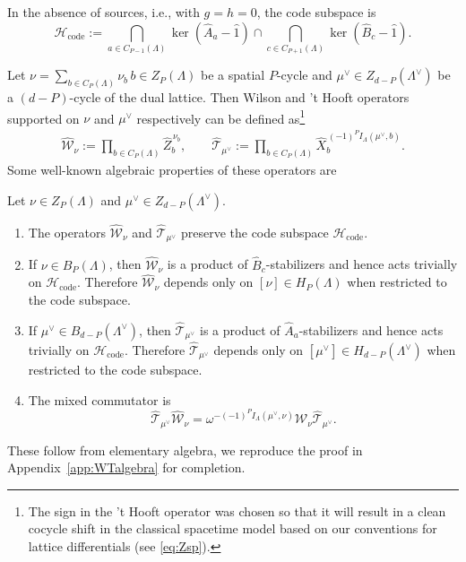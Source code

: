 In the absence of sources, i.e., with $g=h=0$, the code subspace is
\begin{equation}
	\mathcal H_{\mathrm{code}}
	:=
	\bigcap_{a\in C_{P-1}(\Lambda)}\ker(\hat A_a-\hat 1)
	\cap
	\bigcap_{c\in C_{P+1}(\Lambda)}\ker(\hat B_c-\hat 1).
	\label{eq:code-subspace}
\end{equation}

Let $\nu=\sum_{b\in C_P(\Lambda)}\nu_b\,b\in Z_P(\Lambda)$ be a spatial \(P\)-cycle and $\mu^\vee\in Z_{d-P}(\Lambda^\vee)$ be a $(d-P)$-cycle of the dual lattice. Then Wilson and 't Hooft operators supported on $\nu$ and $\mu^\vee$ respectively can be defined as\footnote{The sign in the 't Hooft operator was chosen so that it will result in a clean cocycle shift in the classical spacetime model based on our conventions for lattice differentials (see \eqref{eq:Zsp}).}
\begin{align}
	\hat{\mathcal W}_\nu
	:=
	\prod_{b\in C_P(\Lambda)}\hat Z_b^{\,\nu_b},
	\qquad
	\hat{\mathcal T}_{\mu^\vee}
	:=
	\prod_{b\in C_P(\Lambda)}
	\hat X_b^{\,(-1)^P I_\Lambda(\mu^\vee,b)}.
	\label{eq:quantumWT}
\end{align}
Some well-known algebraic properties of these operators are
\begin{prop}
	\label{prop:spatial-WT}
	Let \(\nu\in Z_P(\Lambda)\) and
	\(\mu^\vee\in Z_{d-P}(\Lambda^\vee)\).
	\begin{enumerate}[label=(\roman*)]
		\item\label{prop:WTpreserves} The operators \(\hat{\mathcal W}_\nu\) and
		\(\hat{\mathcal T}_{\mu^\vee}\) preserve the code subspace
		\(\mathcal H_{\mathrm{code}}\).
		
		\item\label{prop:Wtrivial} If \(\nu\in B_P(\Lambda)\), then \(\hat{\mathcal W}_\nu\) is a product of
		\(\hat B_c\)-stabilizers and hence acts trivially on
		\(\mathcal H_{\mathrm{code}}\). Therefore \(\hat{\mathcal W}_\nu\) depends only on
		\([\nu]\in H_P(\Lambda)\) when restricted to the code subspace.
		
		\item\label{prop:Ttrivial} If \(\mu^\vee\in B_{d-P}(\Lambda^\vee)\), then
		\(\hat{\mathcal T}_{\mu^\vee}\) is a product of \(\hat A_a\)-stabilizers and hence
		acts trivially on \(\mathcal H_{\mathrm{code}}\). Therefore
		\(\hat{\mathcal T}_{\mu^\vee}\) depends only on
		\([\mu^\vee]\in H_{d-P}(\Lambda^\vee)\) when restricted to the code subspace.
		
		\item\label{prop:WTcommutator} The mixed commutator is
		\begin{equation}
			\hat{\mathcal T}_{\mu^\vee}\hat{\mathcal W}_\nu
			=
			\omega^{-(-1)^P I_\Lambda(\mu^\vee,\nu)}
			\hat{\mathcal W}_\nu\hat{\mathcal T}_{\mu^\vee}.
		\end{equation}
	\end{enumerate}
\end{prop}
These follow from elementary algebra, we reproduce the proof in Appendix~\ref{app:WTalgebra} for completion.

